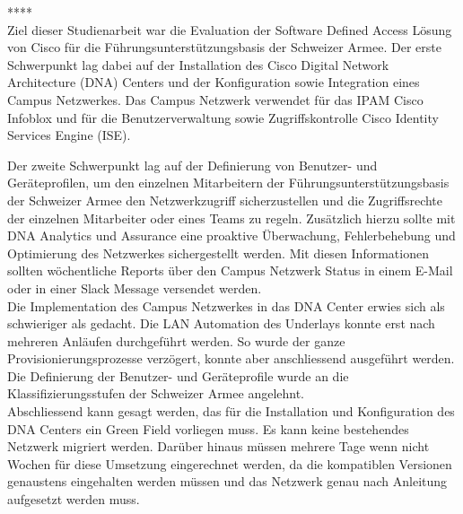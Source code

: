 **** \\
Ziel dieser Studienarbeit war die Evaluation der Software Defined Access Lösung von Cisco für die Führungsunterstützungsbasis der Schweizer Armee. Der erste Schwerpunkt lag dabei auf der Installation des Cisco Digital Network Architecture (DNA) Centers und der Konfiguration sowie Integration eines Campus Netzwerkes. Das Campus Netzwerk verwendet für das IPAM Cisco Infoblox und für die Benutzerverwaltung sowie Zugriffskontrolle Cisco Identity Services Engine (ISE).

Der zweite Schwerpunkt lag auf der Definierung von Benutzer- und Geräteprofilen, um den einzelnen Mitarbeitern der Führungsunterstützungsbasis der Schweizer Armee den Netzwerkzugriff sicherzustellen und die Zugriffsrechte der einzelnen Mitarbeiter oder eines Teams zu regeln. Zusätzlich hierzu sollte mit DNA Analytics und Assurance eine proaktive Überwachung, Fehlerbehebung und Optimierung des Netzwerkes sichergestellt werden. Mit diesen Informationen sollten wöchentliche Reports über den Campus Netzwerk Status in einem E-Mail oder in einer Slack Message versendet werden.
\\

Die Implementation des Campus Netzwerkes in das DNA Center erwies sich als schwieriger als gedacht. Die LAN Automation des Underlays konnte erst nach mehreren Anläufen durchgeführt werden. So wurde der ganze Provisionierungsprozesse verzögert, konnte aber anschliessend ausgeführt werden. Die Definierung der Benutzer- und Geräteprofile wurde an die Klassifizierungsstufen der Schweizer Armee angelehnt.
\\

Abschliessend kann gesagt werden, das für die Installation und Konfiguration des DNA Centers ein Green Field vorliegen muss. Es kann keine bestehendes Netzwerk migriert werden. Darüber hinaus müssen mehrere Tage wenn nicht Wochen für diese Umsetzung eingerechnet werden, da die kompatiblen Versionen genaustens eingehalten werden müssen und das Netzwerk genau nach Anleitung aufgesetzt werden muss.


